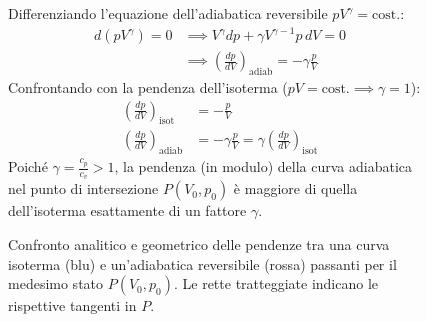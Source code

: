 \begin{figure}[ht]
\centering
\begin{minipage}{0.42\textwidth}
\centering
{}
\end{minipage}\hfill
\begin{minipage}{0.54\textwidth}
Differenziando l'equazione dell'adiabatica reversibile $pV^\gamma = \text{cost.}$:
\begin{align*}
    d(pV^\gamma) = 0 &\implies V^\gamma dp + \gamma V^{\gamma-1} p\,dV = 0 \\
    &\implies \left( \frac{dp}{dV} \right)_{\text{adiab}} = - \gamma \frac{p}{V}
\end{align*}
Confrontando con la pendenza dell'isoterma ($pV = \text{cost.} \implies \gamma = 1$):
\begin{align}
    \left( \frac{dp}{dV} \right)_{\text{isot}} &= - \frac{p}{V} \\
    \left( \frac{dp}{dV} \right)_{\text{adiab}} &= - \gamma \frac{p}{V} = \gamma \left( \frac{dp}{dV} \right)_{\text{isot}}
\end{align}
Poiché $\gamma = \frac{c_p}{c_v} > 1$, la pendenza (in modulo) della curva adiabatica nel punto di intersezione $P(V_0, p_0)$ è maggiore di quella dell'isoterma esattamente di un fattore $\gamma$.
\end{minipage}
\caption{Confronto analitico e geometrico delle pendenze tra una curva isoterma (blu) e un'adiabatica reversibile (rossa) passanti per il medesimo stato $P(V_0, p_0)$. Le rette tratteggiate indicano le rispettive tangenti in $P$.}
\end{figure}

